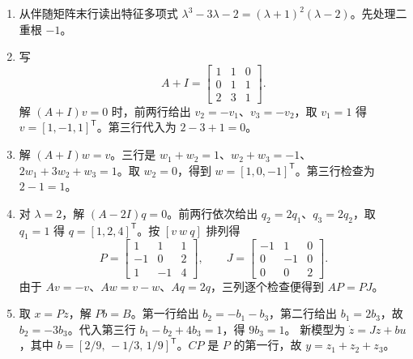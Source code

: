 

\sol
\begin{enumerate}[leftmargin=*,nosep]
    \item 从伴随矩阵末行读出特征多项式 $\lambda^3-3\lambda-2=(\lambda+1)^2(\lambda-2)$。先处理二重根 $-1$。
    \item 写
    \[
       A+I=\begin{bmatrix}1&1&0\\0&1&1\\2&3&1\end{bmatrix}.
    \]
    解 $(A+I)v=0$ 时，前两行给出 $v_2=-v_1$、$v_3=-v_2$，取 $v_1=1$ 得 $v=[1,-1,1]^{\mathsf T}$。第三行代入为 $2-3+1=0$。
    \item 解 $(A+I)w=v$。三行是 $w_1+w_2=1$、$w_2+w_3=-1$、$2w_1+3w_2+w_3=1$。取 $w_2=0$，得到 $w=[1,0,-1]^{\mathsf T}$。第三行检查为 $2-1=1$。
    \item 对 $\lambda=2$，解 $(A-2I)q=0$。前两行依次给出 $q_2=2q_1$、$q_3=2q_2$，取 $q_1=1$ 得 $q=[1,2,4]^{\mathsf T}$。按 $[v\ w\ q]$ 排列得
    \[
      P=\begin{bmatrix}1&1&1\\-1&0&2\\1&-1&4\end{bmatrix},\qquad
      J=\begin{bmatrix}-1&1&0\\0&-1&0\\0&0&2\end{bmatrix}.
    \]
    由于 $Av=-v$、$Aw=v-w$、$Aq=2q$，三列逐个检查便得到 $AP=PJ$。
    \item 取 $x=Pz$，解 $Pb=B$。第一行给出 $b_2=-b_1-b_3$，第二行给出 $b_1=2b_3$，故 $b_2=-3b_3$。代入第三行 $b_1-b_2+4b_3=1$，得 $9b_3=1$。
    新模型为 $\dot z=Jz+bu$，其中 $b=[2/9,\,-1/3,\,1/9]^{\mathsf T}$。$CP$ 是 $P$ 的第一行，故 $y=z_1+z_2+z_3$。
\end{enumerate}
